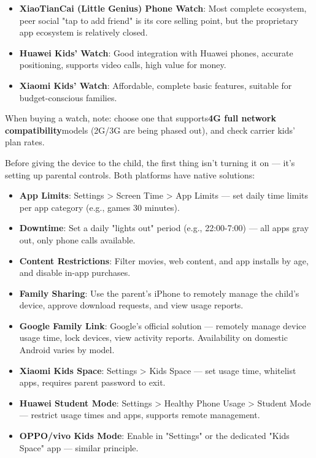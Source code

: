 \begin{itemize}
  \item \textbf{XiaoTianCai (Little Genius) Phone Watch}: Most complete ecosystem, peer social "tap to add friend" is its core selling point, but the proprietary app ecosystem is relatively closed.
  \item \textbf{Huawei Kids' Watch}: Good integration with Huawei phones, accurate positioning, supports video calls, high value for money.
  \item \textbf{Xiaomi Kids' Watch}: Affordable, complete basic features, suitable for budget-conscious families.
\end{itemize}

When buying a watch, note: choose one that supports\textbf{4G full network compatibility}models (2G/3G are being phased out), and check carrier kids' plan rates.


Before giving the device to the child, the first thing isn't turning it on — it's setting up parental controls. Both platforms have native solutions:


\begin{itemize}
  \item \textbf{App Limits}: Settings > Screen Time > App Limits — set daily time limits per app category (e.g., games 30 minutes).
  \item \textbf{Downtime}: Set a daily "lights out" period (e.g., 22:00-7:00) — all apps gray out, only phone calls available.
  \item \textbf{Content Restrictions}: Filter movies, web content, and app installs by age, and disable in-app purchases.
  \item \textbf{Family Sharing}: Use the parent's iPhone to remotely manage the child's device, approve download requests, and view usage reports.
\end{itemize}


\begin{itemize}
  \item \textbf{Google Family Link}: Google's official solution — remotely manage device usage time, lock devices, view activity reports. Availability on domestic Android varies by model.
  \item \textbf{Xiaomi Kids Space}: Settings > Kids Space — set usage time, whitelist apps, requires parent password to exit.
  \item \textbf{Huawei Student Mode}: Settings > Healthy Phone Usage > Student Mode — restrict usage times and apps, supports remote management.
  \item \textbf{OPPO/vivo Kids Mode}: Enable in "Settings" or the dedicated "Kids Space" app — similar principle.
\end{itemize}

